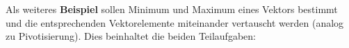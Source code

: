 \newpage
Als weiteres \textbf{Beispiel} sollen Minimum und Maximum eines
Vektors bestimmt und die entsprechenden Vektorelemente
miteinander vertauscht werden (analog zu Pivotisierung).
Dies beinhaltet die beiden Teilaufgaben: \\[1ex]
%
%
% 

